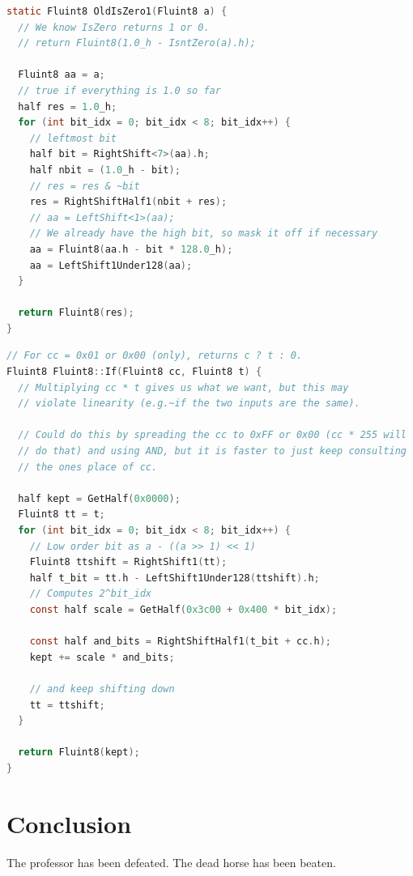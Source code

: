 \documentclass[twocolumn]{article}
\begin{document}
\begin{lstlisting}[language=C]
static Fluint8 OldIsZero1(Fluint8 a) {
  // We know IsZero returns 1 or 0.
  // return Fluint8(1.0_h - IsntZero(a).h);

  Fluint8 aa = a;
  // true if everything is 1.0 so far
  half res = 1.0_h;
  for (int bit_idx = 0; bit_idx < 8; bit_idx++) {
    // leftmost bit
    half bit = RightShift<7>(aa).h;
    half nbit = (1.0_h - bit);
    // res = res & ~bit
    res = RightShiftHalf1(nbit + res);
    // aa = LeftShift<1>(aa);
    // We already have the high bit, so mask it off if necessary
    aa = Fluint8(aa.h - bit * 128.0_h);
    aa = LeftShift1Under128(aa);
  }

  return Fluint8(res);
}
\end{lstlisting}



\begin{lstlisting}[language=C]
  // For cc = 0x01 or 0x00 (only), returns c ? t : 0.
Fluint8 Fluint8::If(Fluint8 cc, Fluint8 t) {
  // Multiplying cc * t gives us what we want, but this may
  // violate linearity (e.g.~if the two inputs are the same).

  // Could do this by spreading the cc to 0xFF or 0x00 (cc * 255 will
  // do that) and using AND, but it is faster to just keep consulting
  // the ones place of cc.

  half kept = GetHalf(0x0000);
  Fluint8 tt = t;
  for (int bit_idx = 0; bit_idx < 8; bit_idx++) {
    // Low order bit as a - ((a >> 1) << 1)
    Fluint8 ttshift = RightShift1(tt);
    half t_bit = tt.h - LeftShift1Under128(ttshift).h;
    // Computes 2^bit_idx
    const half scale = GetHalf(0x3c00 + 0x400 * bit_idx);

    const half and_bits = RightShiftHalf1(t_bit + cc.h);
    kept += scale * and_bits;

    // and keep shifting down
    tt = ttshift;
  }

  return Fluint8(kept);
}
\end{lstlisting}


\section{Conclusion}
The professor has been defeated. The dead horse has been beaten.

{}

\end{document}
